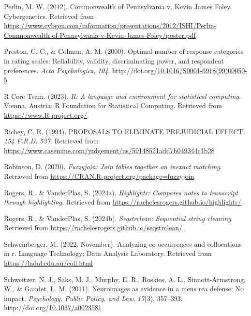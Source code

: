 \documentclass[print]{nuthesis}
\newlength{\cslhangindent}
\newenvironment{CSLReferences}[2]%
{\setlength{\parindent}{0pt}%
\everypar{\setlength{\hangindent}{\cslhangindent}}\ignorespaces}%
{\par}
\begin{document}
\begin{CSLReferences}{1}{0}
\leavevmode{}%
Perlin, M. W. (2012). Commonwealth of {Pennsylvania} v. {Kevin James Foley}. Cybergenetics. Retrieved from \url{https://www.cybgen.com/information/presentations/2012/ISHI/Perlin-Commonwealth-of-Pennsylvania-v-Kevin-James-Foley/poster.pdf}

\leavevmode{}%
Preston, C. C., \& Colman, A. M. (2000). Optimal number of response categories in rating scales: Reliability, validity, discriminating power, and respondent preferences. \emph{Acta Psychologica}, \emph{104}. http://doi.org/\href{https://doi.org/10.1016/S0001-6918(99)00050-5}{10.1016/S0001-6918(99)00050-5}

\leavevmode{}%
R Core Team. (2023). \emph{R: A language and environment for statistical computing}. Vienna, Austria: R Foundation for Statistical Computing. Retrieved from \url{https://www.R-project.org/}

\leavevmode{}%
Richey, C. R. (1994). PROPOSALS TO ELIMINATE PREJUDICIAL EFFECT. \emph{154 {F}.{R}.{D}. 537}. Retrieved from \url{https://www.casemine.com/judgement/us/59148521add7b049344c1b28}

\leavevmode{}%
Robinson, D. (2020). \emph{Fuzzyjoin: Join tables together on inexact matching}. Retrieved from \url{https://CRAN.R-project.org/package=fuzzyjoin}

\leavevmode{}%
Rogers, R., \& VanderPlas, S. (2024a). \emph{Highlightr: Compares notes to transcript through highlighting}. Retrieved from \url{https://rachelesrogers.github.io/highlightr/}

\leavevmode{}%
Rogers, R., \& VanderPlas, S. (2024b). \emph{Seqstrclean: Sequential string cleaning}. Retrieved from \url{https://rachelesrogers.github.io/seqstrclean/}

\leavevmode{}%
Schweinberger, M. (2022, November). Analyzing co-occurrences and collocations in r. Language Technology; Data Analysis Laboratory. Retrieved from \url{https://ladal.edu.au/coll.html}

\leavevmode{}%
Schweitzer, N. J., Saks, M. J., Murphy, E. R., Roskies, A. L., Sinnott-Armstrong, W., \& Gaudet, L. M. (2011). Neuroimages as evidence in a mens rea defense: {No} impact. \emph{Psychology, Public Policy, and Law}, \emph{17}(3), 357--393. http://doi.org/\href{https://doi.org/10.1037/a0023581}{10.1037/a0023581}


\end{CSLReferences}
\end{document}
